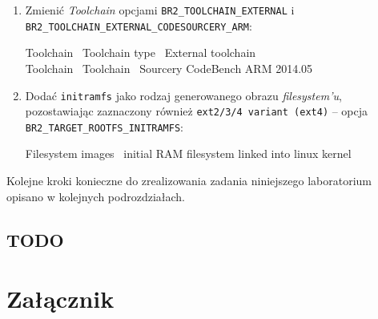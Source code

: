 \documentclass{article}
\newenvironment{ttblock}{\ttfamily}{\par}
\begin{document}
\begin{enumerate}
\item Zmienić \emph{Toolchain} opcjami \texttt{BR2\_TOOLCHAIN\_EXTERNAL} i\\ \texttt{BR2\_TOOLCHAIN\_EXTERNAL\_CODESOURCERY\_ARM}:

\begin{ttblock}
Toolchain \textrightarrow\ Toolchain type \textrightarrow\ External toolchain\\
Toolchain \textrightarrow\ Toolchain \textrightarrow\ Sourcery CodeBench ARM 2014.05
\end{ttblock}

\item Dodać \texttt{initramfs} jako rodzaj generowanego obrazu \emph{filesystem'u}, pozostawiając zaznaczony również \texttt{ext2/3/4 variant (ext4)} -- opcja \\\texttt{BR2\_TARGET\_ROOTFS\_INITRAMFS}:

\begin{ttblock}
Filesystem images \textrightarrow\ initial RAM filesystem linked into linux kernel
\end{ttblock}
\end{enumerate}

Kolejne kroki konieczne do zrealizowania zadania niniejszego laboratorium opisano w kolejnych podrozdziałach.


\subsection{TODO}


\section{Załącznik}
\end{document}
